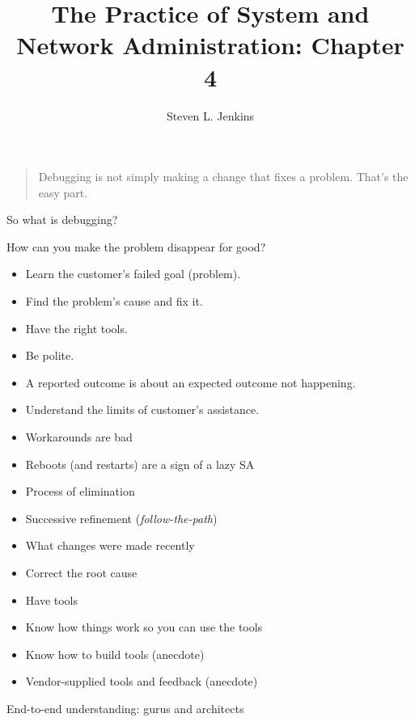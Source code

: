 \documentclass{slides}
\title{The Practice of System and Network Administration: Chapter 4}
\author{Steven L. Jenkins}
\newcommand{\bi}{\begin{itemize}}
\newcommand{\ei}{\end{itemize}}
\begin{document}


\begin{quotation}
Debugging is not simply making a change that fixes a problem.  That's
the easy part.
\end{quotation}

So what is debugging?


How can you make the problem disappear for good?


\bi
\item Learn the customer's failed goal (problem).
\item Find the problem's cause and fix it.
\item Have the right tools.
\ei


\bi
\item Be polite.
\item A reported outcome is about an expected outcome not happening.
\item Understand the limits of customer's assistance.
\ei


\bi
\item Workarounds are bad
\item Reboots (and restarts) are a sign of a lazy SA
\item Process of elimination
\item Successive refinement (\emph{follow-the-path})
\item What changes were made recently
\item Correct the root cause
\ei


\bi
\item Have tools
\item Know how things work so you can use the tools
\item Know how to build tools (anecdote)
\item Vendor-supplied tools and feedback (anecdote)
\ei


End-to-end understanding: gurus and architects
\end{document}
